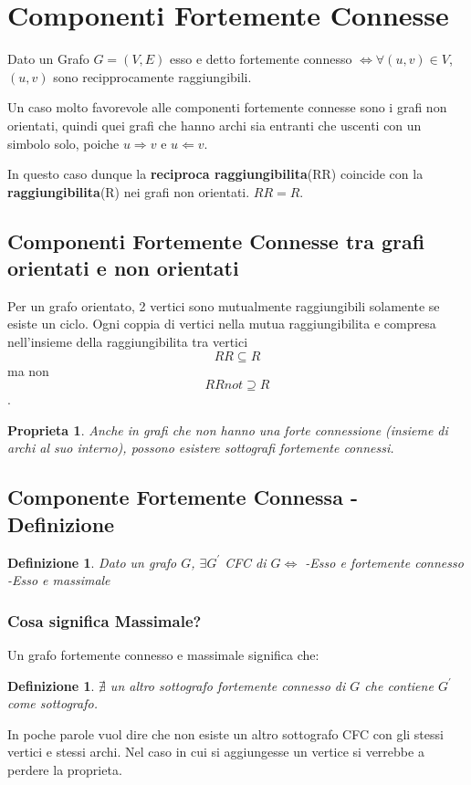 \section{Componenti Fortemente Connesse}
Dato un Grafo $G = (V,E)$ esso e detto fortemente connesso $\iff \forall (u,v) \in V$, $(u,v)$ sono recipprocamente raggiungibili.

Un caso molto favorevole alle componenti fortemente connesse sono i grafi non orientati, quindi quei grafi che hanno archi sia entranti che uscenti con un simbolo solo, poiche $u \Rightarrow v$ e $u \Leftarrow v$.

In questo caso dunque la \textbf{reciproca raggiungibilita}(RR) coincide con la \textbf{raggiungibilita}(R) nei grafi non orientati. $RR = R$.


\subsection{Componenti Fortemente Connesse tra grafi orientati e non orientati}

Per un grafo orientato, 2 vertici sono mutualmente raggiungibili solamente se esiste un ciclo.
Ogni coppia di vertici nella mutua raggiungibilita e compresa nell'insieme della raggiungibilita tra vertici
 $$RR \subseteq R$$ ma non $$RR not \supseteq R$$.

\newtheorem{proprieta}{Proprieta}

\begin{proprieta}
	Anche in grafi che non hanno una forte connessione (insieme di archi al suo interno), possono esistere sottografi fortemente connessi.
\end{proprieta}

\subsection{Componente Fortemente Connessa - Definizione}
\newtheorem{compfortconn}{Definizione}

\begin{compfortconn}
	Dato un grafo $G$, $\exists G^{\prime}$ CFC di $G \iff$ 
		-Esso e fortemente connesso
		-Esso e massimale
\end{compfortconn}

\subsubsection{Cosa significa Massimale?}
Un grafo fortemente connesso e massimale significa che:
\newtheorem{massimale}{Definizione}
\begin{massimale}
	$\nexists$ un altro sottografo fortemente connesso di $G$ che contiene $G^{\prime}$ come sottografo.
\end{massimale}
In poche parole vuol dire che non esiste un altro sottografo CFC con gli stessi vertici e stessi archi. Nel caso in cui si aggiungesse un vertice si verrebbe a perdere la proprieta.

